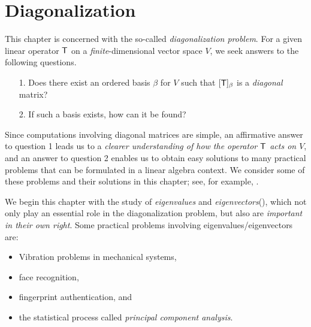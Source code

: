 \chapter{Diagonalization} \label{ch 5}

This chapter is concerned with the so-called \emph{diagonalization problem}.
For a given linear operator \(\textsf{T}\) on a \emph{finite}-dimensional vector space \(V\), we seek answers to the following questions.
\begin{enumerate}
\item[1.] Does there exist an ordered basis \(\beta\) for \(V\) such that \([\textsf{T}]_{\beta}\) is a \emph{diagonal} matrix?
\item[2.] If such a basis exists, how can it be found?
\end{enumerate}

Since computations involving diagonal matrices are simple, an affirmative answer to question 1 leads us to a \emph{clearer understanding of how the operator \(\textsf{T}\) acts on \(V\)},
and an answer to question 2 enables us to obtain easy solutions to many practical problems that can be formulated in a linear algebra context.
We consider some of these problems and their solutions in this chapter;
see, for example, .

We begin this chapter with the study of \emph{eigenvalues} and \emph{eigenvectors}(), which not only play an essential role in the diagonalization problem, but also are \emph{important in their own right}.
Some practical problems involving eigenvalues/eigenvectors are:
\begin{itemize}
    \item Vibration problems in mechanical systems,
    \item face recognition,
    \item fingerprint authentication, and
    \item the statistical process called \emph{principal component analysis}.
\end{itemize}








